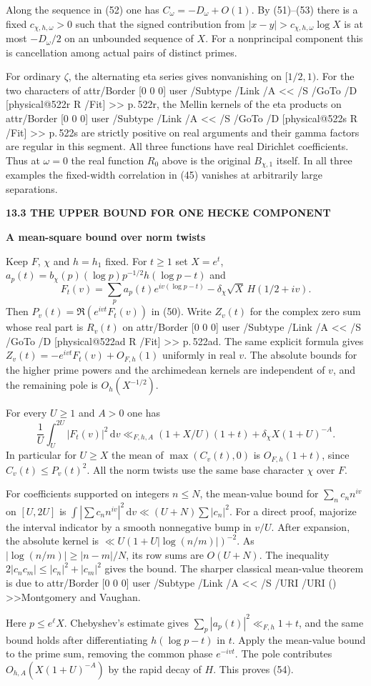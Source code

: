 \documentclass[11pt,letterpaper]{article}
\makeatletter
\newcommand{\rightmarktext}{}
\newcommand{\printfolio}{}
\newcommand{\leaf}[4]{\clearpage\gdef\printfolio{#1}\gdef\rightmarktext{#2}%
  {\small\sffamily\bfseries\color{ink}#3\par}\vspace{3pt}%
  {\LARGE\bfseries #4\par}\vspace{5pt}}
\newcommand{\dd}{\,\mathrm d}
\newcommand{\citetitle}[2]{\leavevmode\pdfstartlink attr{/Border [0 0 0]} user{%
 /Subtype /Link /A << /S /URI /URI (\pdfescapestring{\detokenize{#1}}) >>}{\color{ink}#2}\pdfendlink}
\newcommand{\MusicPDFPageRef}[1]{\pdfpageref\csname physical@#1\endcsname\space\space 0 R}
\newcommand{\pagelink}[2]{\leavevmode\pdfstartlink attr{/Border [0 0 0]} user{%
  /Subtype /Link /A << /S /GoTo /D [\MusicPDFPageRef{#1} /Fit] >>}%
  {\color{ink}#2}\pdfendlink}
\newcommand{\pg}[1]{\pagelink{#1}{p.\,#1}}
\makeatother
\begin{document}
Along the sequence in (52) one has $C_\omega=-D_\omega+O(1)$.
By (51)--(53) there is a fixed $c_{\chi,h,\omega}>0$ such that the
signed contribution from $|x-y|>c_{\chi,h,\omega}\log X$ is at most
$-D_\omega/2$ on an unbounded sequence of $X$. For a nonprincipal
component this is cancellation among actual pairs of distinct primes.

For ordinary $\zeta$, the alternating eta series gives nonvanishing
on $[1/2,1)$. For the two characters of \pg{522r}, the Mellin kernels
of the eta products on \pg{522s} are strictly positive on real
arguments and their gamma factors are regular in this segment.
All three functions have real Dirichlet coefficients. Thus at
$\omega=0$ the real function $R_0$ above is the original
$B_{\chi,1}$ itself. In all three examples the fixed-width correlation
in (45) vanishes at arbitrarily large separations.

\leaf{522ah}{Frequency averages}{13.3 \quad THE UPPER BOUND FOR ONE HECKE COMPONENT}{A mean-square bound over norm twists}
Keep $F$, $\chi$ and $h=h_1$ fixed. For $t\ge1$ set $X=e^t$,
$a_p(t)=b_\chi(p)(\log p)p^{-1/2}h(\log p-t)$ and
\[
 F_t(v)=\sum_p a_p(t)e^{iv(\log p-t)}
               -\delta_\chi\sqrt X\,H(1/2+iv).
\]
Then $P_v(t)=\Re(e^{ivt}F_t(v))$ in (50). Write $Z_v(t)$ for the
complex zero sum whose real part is $R_v(t)$ on \pg{522ad}. The same
explicit formula gives $Z_v(t)=-e^{ivt}F_t(v)+O_{F,h}(1)$ uniformly
in real $v$. The absolute bounds for the higher prime powers and the
archimedean kernels are independent of $v$, and the remaining pole
is $O_h(X^{-1/2})$.

For every $U\ge1$ and $A>0$ one has
\[
 \frac1U\int_U^{2U}|F_t(v)|^2\dd v
 \ll_{F,h,A}(1+X/U)(1+t)+\delta_\chi X(1+U)^{-A}.
 \tag{54}
\]
In particular for $U\ge X$ the mean of $\max(C_v(t),0)$ is
$O_{F,h}(1+t)$, since $C_v(t)\le P_v(t)^2$. All the norm
twists use the same base character $\chi$ over $F$.

For coefficients supported on integers $n\le N$, the mean-value
bound for $\sum_n c_n n^{iv}$ on $[U,2U]$ is
$\int|\sum c_n n^{iv}|^2\dd v\ll (U+N)\sum|c_n|^2$.
For a direct proof, majorize the interval indicator by a smooth
nonnegative bump in $v/U$. After expansion, the absolute kernel
is $\ll U(1+U|\log(n/m)|)^{-2}$. As
$|\log(n/m)|\ge |n-m|/N$, its row sums are $O(U+N)$. The inequality
$2|c_nc_m|\le |c_n|^2+|c_m|^2$ gives the bound. The sharper classical
mean-value theorem is due to
\citetitle{https://doi.org/10.1112/jlms/s2-8.1.73}{Montgomery and Vaughan}.

Here $p\le e^\ell X$. Chebyshev's estimate gives
$\sum_p|a_p(t)|^2\ll_{F,h}1+t$, and the same bound holds after
differentiating $h(\log p-t)$ in $t$. Apply the mean-value bound to
the prime sum, removing the common phase $e^{-ivt}$. The pole
contributes $O_{h,A}(X(1+U)^{-A})$ by the rapid decay of $H$.
This proves (54).
\end{document}
